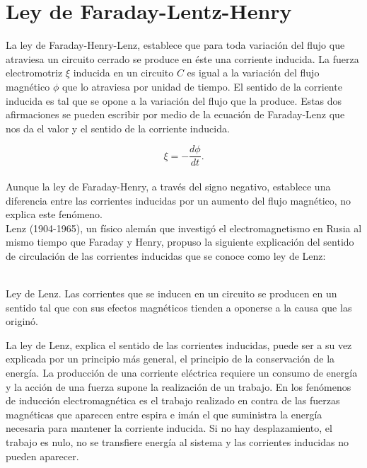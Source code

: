 \documentclass[11pt,fleqn]{book} %
\begin{document}
\section{Ley de Faraday-Lentz-Henry}
La ley de Faraday-Henry-Lenz, establece que para toda variaci\'on del flujo que atraviesa un circuito cerrado se produce en \'este una corriente inducida. La fuerza electromotriz $\xi$ inducida en un circuito $C$ es igual a la variaci\'on del flujo   magn\'etico $\phi$ que lo atraviesa por unidad de tiempo. El sentido de la corriente inducida es tal que se opone a la variaci\'on del flujo que la produce. Estas dos afirmaciones se pueden escribir por medio de la ecuaci\'on de Faraday-Lenz que nos da el valor y el sentido de la corriente inducida.

\begin{equation}
\xi=-\frac{d \phi}{dt}.
\end{equation}\\
Aunque la ley de Faraday-Henry, a trav\'es del  signo negativo, establece una diferencia entre las corrientes inducidas por un aumento del flujo magn\'etico, no explica este fen\'omeno.\\ Lenz (1904-1965), un f\'isico alem\'an que investig\'o el electromagnetismo en Rusia al mismo tiempo que Faraday y Henry, propuso la siguiente explicaci\'on del sentido de circulaci\'on de las corrientes inducidas que se conoce como ley de Lenz:\\\\

\begin{definition}
Ley de Lenz. Las corrientes que se inducen en un circuito se producen en un sentido tal que con sus efectos magn\'eticos tienden a oponerse a la causa que las origin\'o. \cite{Wangness2001}
\end{definition}
La ley de Lenz, explica el sentido de las corrientes inducidas, puede ser a su vez explicada por un principio m\'as general, el principio de la conservaci\'on de la energ\'ia. La producci\'on de una corriente el\'ectrica requiere un consumo de energ\'ia y la acci\'on de una fuerza supone la realizaci\'on de un trabajo. En los fen\'omenos de inducci\'on electromagn\'etica es el trabajo realizado en contra de las fuerzas magn\'eticas que aparecen entre espira e im\'an el que suministra la energ\'ia necesaria para mantener la corriente inducida. Si no hay desplazamiento, el trabajo es nulo, no se transfiere energ\'ia al sistema y las corrientes inducidas no pueden aparecer.
\end{document}
